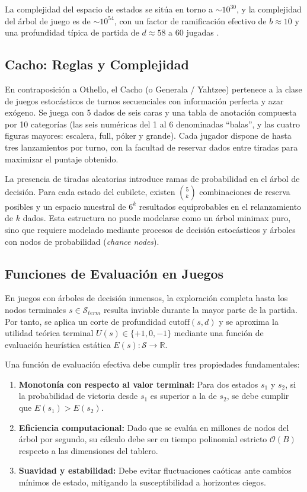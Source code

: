 \documentclass[10pt,a4paper]{article}
\begin{document}
La complejidad del espacio de estados se sitúa en torno a $\sim 10^{30}$, y la complejidad del árbol de juego es de $\sim 10^{54}$, con un factor de ramificación efectivo de $b \approx 10$ y una profundidad típica de partida de $d \approx 58$ a $60$ jugadas \cite{rosenbloom1982world}.

\subsection{Cacho: Reglas y Complejidad}
En contraposición a Othello, el Cacho (o Generala / Yahtzee) pertenece a la clase de juegos estocásticos de turnos secuenciales con información perfecta y azar exógeno. Se juega con 5 dados de seis caras y una tabla de anotación compuesta por 10 categorías (las seis numéricas del 1 al 6 denominadas ``balas'', y las cuatro figuras mayores: escalera, full, póker y grande). Cada jugador dispone de hasta tres lanzamientos por turno, con la facultad de reservar dados entre tiradas para maximizar el puntaje obtenido. 

La presencia de tiradas aleatorias introduce ramas de probabilidad en el árbol de decisión. Para cada estado del cubilete, existen $\binom{5}{k}$ combinaciones de reserva posibles y un espacio muestral de $6^k$ resultados equiprobables en el relanzamiento de $k$ dados. Esta estructura no puede modelarse como un árbol minimax puro, sino que requiere modelado mediante procesos de decisión estocásticos y árboles con nodos de probabilidad (\textit{chance nodes}).

\subsection{Funciones de Evaluación en Juegos}
En juegos con árboles de decisión inmensos, la exploración completa hasta los nodos terminales $s \in \mathcal{S}_{term}$ resulta inviable durante la mayor parte de la partida. Por tanto, se aplica un corte de profundidad $\text{cutoff}(s, d)$ y se aproxima la utilidad teórica terminal $U(s) \in \{+1, 0, -1\}$ mediante una función de evaluación heurística estática $E(s): \mathcal{S} \to \mathbb{R}$.

Una función de evaluación efectiva debe cumplir tres propiedades fundamentales:
\begin{enumerate}
    \item \textbf{Monotonía con respecto al valor terminal:} Para dos estados $s_1$ y $s_2$, si la probabilidad de victoria desde $s_1$ es superior a la de $s_2$, se debe cumplir que $E(s_1) > E(s_2)$.
    \item \textbf{Eficiencia computacional:} Dado que se evalúa en millones de nodos del árbol por segundo, su cálculo debe ser en tiempo polinomial estricto $\mathcal{O}(B)$ respecto a las dimensiones del tablero.
    \item \textbf{Suavidad y estabilidad:} Debe evitar fluctuaciones caóticas ante cambios mínimos de estado, mitigando la susceptibilidad a horizontes ciegos.
\end{enumerate}
\end{document}
